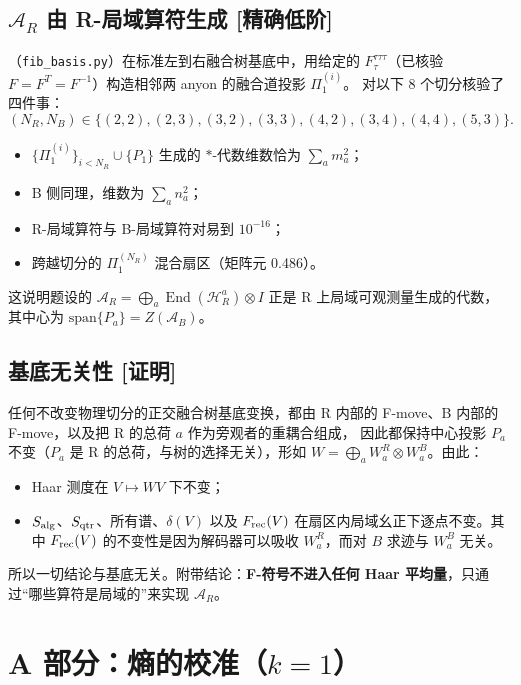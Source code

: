 \documentclass[11pt,a4paper,UTF8]{ctexart}
\newcommand{\Frec}{F_{\rm rec}}
\newcommand{\Salg}{S_{\rm alg}}
\newcommand{\Sqtr}{S_{\rm qtr}}
\newcommand{\code}[1]{\texttt{#1}}
\newcommand{\tagP}{\texorpdfstring{\textcolor{cP}{\textbf{[证明]}}}{[证明]}}
\newcommand{\tagE}{\texorpdfstring{\textcolor{cE}{\textbf{[精确低阶]}}}{[精确低阶]}}
\begin{document}
\subsection{\texorpdfstring{$\mathcal A_R$}{A\_R} 由 R-局域算符生成 \tagE}\label{ss:AR}
（\code{fib\_basis.py}）在标准左到右融合树基底中，用给定的 $F^{\tau\tau\tau}_\tau$（已核验 $F=F^T=F^{-1}$）构造相邻两 anyon 的融合道投影 $\Pi^{(i)}_1$。
对以下 8 个切分核验了四件事：
\[(N_R,N_B)\in\{(2,2),(2,3),(3,2),(3,3),(4,2),(3,4),(4,4),(5,3)\}.\]
\begin{itemize}
  \item $\{\Pi^{(i)}_1\}_{i<N_R}\cup\{P_1\}$ 生成的 $*$-代数维数恰为 $\sum_am_a^2$；
  \item B 侧同理，维数为 $\sum_an_a^2$；
  \item R-局域算符与 B-局域算符对易到 $10^{-16}$；
  \item 跨越切分的 $\Pi^{(N_R)}_1$ 混合扇区（矩阵元 0.486）。
\end{itemize}
这说明题设的 $\mathcal A_R=\bigoplus_a\operatorname{End}(\mathcal H_R^a)\otimes I$ 正是 R 上局域可观测量生成的代数，其中心为 $\mathrm{span}\{P_a\}=Z(\mathcal A_B)$。

\subsection{基底无关性 \tagP}\label{ss:basis-indep}
任何不改变物理切分的正交融合树基底变换，都由 R 内部的 F-move、B 内部的 F-move，以及把 R 的总荷 $a$ 作为旁观者的重耦合组成，
因此都保持中心投影 $P_a$ 不变（$P_a$ 是 R 的总荷，与树的选择无关），形如 $W=\bigoplus_aW_a^R\otimes W_a^B$。由此：
\begin{itemize}
  \item Haar 测度在 $V\mapsto WV$ 下不变；
  \item $\Salg$、$\Sqtr$、所有谱、$\delta(V)$ 以及 $\Frec(V)$ 在扇区内局域幺正下逐点不变。其中 $\Frec(V)$ 的不变性是因为解码器可以吸收 $W_a^R$，而对 $B$ 求迹与 $W_a^B$ 无关。
\end{itemize}
所以一切结论与基底无关。附带结论：\textbf{F-符号不进入任何 Haar 平均量}，只通过“哪些算符是局域的”来实现 $\mathcal A_R$。

\section{A 部分：熵的校准（\texorpdfstring{$k=1$}{k=1}）}\label{sec:A}
\end{document}

